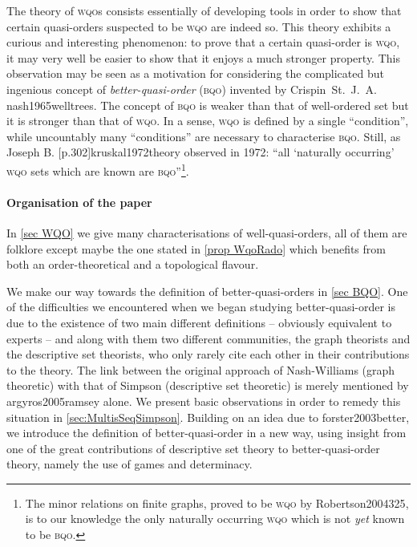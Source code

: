 \documentclass{article}%
\newcommand\textcite{}
\theoremstyle{plain}
\theoremstyle{definition}
\theoremstyle{remark}
\newcommand{\wqo}{\textsc{wqo}}
\newcommand{\bqo}{\textsc{bqo}}
\begin{document}
The theory of \wqo{}s consists essentially of developing tools in order to show that certain quasi-orders suspected to be \wqo{} are indeed so. This theory exhibits a curious and interesting phenomenon: to prove that a certain quasi-order is \wqo{}, it may very well be easier to show that it enjoys a much stronger property. This observation may be seen as a motivation for considering the complicated but ingenious concept of \emph{better-quasi-order} (\bqo{}) invented by Crispin~St.~J.~A. \textcite{nash1965welltrees}. The concept of \bqo{} is weaker than that of well-ordered set but it is stronger than that of \wqo{}. In a sense, \wqo{} is defined by a single \enquote{condition}, while uncountably many \enquote{conditions} are necessary to characterise \bqo{}. Still, as Joseph B. \textcite[p.302]{kruskal1972theory} observed in 1972: \enquote{all \enquote{naturally occurring} \wqo{} sets which are known are \bqo{}}\footnote{The minor relations on finite graphs, proved to be \wqo{} by \textcite{Robertson2004325}, is to our knowledge the only naturally occurring \wqo{} which is not \emph{yet} known to be \bqo{}.}. 

\paragraph{Organisation of the paper}

In \cref{sec WQO} we give many characterisations of well-quasi-orders, all of them are folklore except maybe the one stated in \cref{prop WqoRado} which benefits from both an order-theoretical and a topological flavour. 

We make our way towards the definition of better-quasi-orders in \cref{sec BQO}. 
One of the difficulties we encountered when we began studying better-quasi-order is due to the existence of two main different definitions -- obviously equivalent to experts -- and along with them two different communities, the graph theorists and the descriptive set theorists, who only rarely cite each other in their contributions to the theory. The link between the original approach of Nash-Williams (graph theoretic) with that of Simpson (descriptive set theoretic) is merely mentioned by \textcite{argyros2005ramsey} alone. We present basic observations in order to remedy this situation in \cref{sec:MultisSeqSimpson}. Building on an idea due to \textcite{forster2003better}, we introduce the definition of better-quasi-order in a new way, using insight from one of the great contributions of descriptive set theory to better-quasi-order theory, namely the use of games and determinacy.
\end{document}
